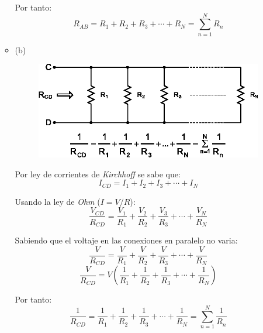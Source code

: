 \documentclass[letter,11pt]{article}
\begin{document}
\begin{enumerate}
\begin{itemize}
        Por tanto:
        \begin{equation*}
            R_{AB}=R_1+R_2+R_3+\cdots+R_N=\sum_{n=1}^N R_n
        \end{equation*}
    \item (b)
        \begin{figure}[!h]
        \centering
        \includegraphics[scale=1.00]{resources/figura3b.eps}
        \end{figure}

        Por ley de corrientes de \emph{Kirchhoff} se sabe que:
        \begin{equation*}
            I_{CD}=I_1+I_2+I_3+\cdots+I_N
        \end{equation*}

        Usando la ley de \emph{Ohm} ($I=V/R$):
        \begin{equation*}
            \frac{V_{CD}}{R_{CD}}=\frac{V_1}{R_1}+\frac{V_2}{R_2}+
            \frac{V_3}{R_3}+\cdots+\frac{V_N}{R_N}
        \end{equation*}

        Sabiendo que el voltaje en las conexiones en paralelo no varia:
        \begin{equation*}
            \frac{V}{R_{CD}}=\frac{V}{R_1}+\frac{V}{R_2}+\frac{V}{R_3}+
            \cdots+\frac{V}{R_N}
        \end{equation*}
        \begin{equation*}
            \frac{V}{R_{CD}}=V\left(\frac{1}{R_1}+\frac{1}{R_2}+\frac{1}{R_3}+
            \cdots+\frac{1}{R_N}\right)
        \end{equation*}

        Por tanto:
        \begin{equation*}
            \frac{1}{R_{CD}}=\frac{1}{R_1}+\frac{1}{R_2}+\frac{1}{R_3}+
            \cdots+\frac{1}{R_N}=\sum_{n=1}^N\frac{1}{R_n}
        \end{equation*}
\end{itemize}


\end{enumerate}
\end{document}
